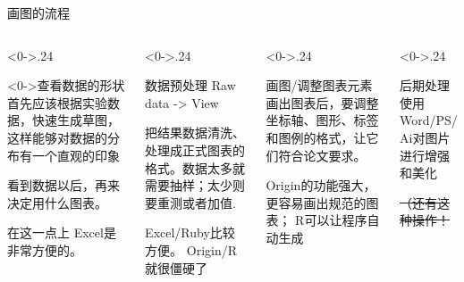 \documentclass[utf8,dvipsnames,aspectratio=169]{beamer}
\newcommand\mk[1]{{\color{RoyalBlue} #1}}
\begin{document}
\begin{frame}{画图的流程}
	\begin{columns}
    \begin{column}<0->{.24\textwidth}
		\begin{block}<0->{\centering 查看数据的形状}
		\setlength{\parskip}{0.5em}
		\vspace{0.5em}
		首先应该根据实验数据，快速生成草图，这样能够对数据的分布有一个直观的印象
		
		看到数据以后，再来决定用什么图表。
		
		在这一点上\mk{Excel}是非常方便的。
		\vspace{0.5em}
		\end{block}
	\end{column}
	\begin{column}<0->{.24\textwidth}
		\begin{block}{\centering 数据预处理}
		\setlength{\parskip}{0.5em}
		\vspace{0.6em}
		{\color{Red} Raw data -> View}
		
		把结果数据清洗、处理成正式图表的格式。数据太多就需要抽样；太少则要重测或者加值.
		
		\mk{Excel/Ruby}比较方便。\mk{Origin/R}就很僵硬了		
		\vspace{0.6em}		
		\end{block}
	\end{column}
	\begin{column}<0->{.24\textwidth}
		\begin{block}{\centering 画图/调整图表元素}
		\setlength{\parskip}{0.5em}
		\vspace{0.8em}
		画出图表后，要调整\mk{坐标轴、图形、标签和图例}的格式，让它们符合论文要求。
		
		\mk{Origin}的功能强大，更容易画出规范的图表；\mk{R}可以让程序自动生成
		\vspace{0.8em}
		\end{block}	
	\end{column}
	\begin{column}<0->{.24\textwidth}
		\begin{block}{\centering 后期处理}
		\setlength{\parskip}{0.5em}
		\vspace{4em}
		使用\mk{Word/PS/Ai}对图片进行增强和美化
		
		\sout{（还有这种操作！}
		\vspace{4em}
		\end{block}
	\end{column}
	\end{columns}
\end{frame}
\end{document}
